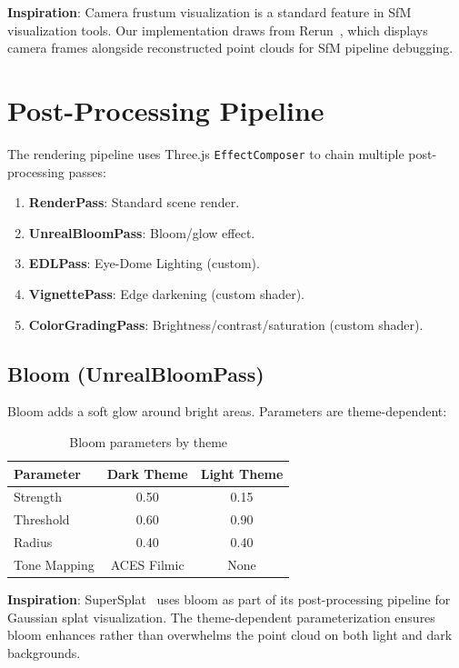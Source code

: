 \documentclass[11pt, letterpaper]{article}
\begin{document}
\textbf{Inspiration}: Camera frustum visualization is a standard feature in SfM visualization tools. Our implementation draws from Rerun~\cite{rerun}, which displays camera frames alongside reconstructed point clouds for SfM pipeline debugging.

\section{Post-Processing Pipeline}

The rendering pipeline uses Three.js \texttt{EffectComposer} to chain multiple post-processing passes:

\begin{enumerate}
    \item \textbf{RenderPass}: Standard scene render.
    \item \textbf{UnrealBloomPass}: Bloom/glow effect.
    \item \textbf{EDLPass}: Eye-Dome Lighting (custom).
    \item \textbf{VignettePass}: Edge darkening (custom shader).
    \item \textbf{ColorGradingPass}: Brightness/contrast/saturation (custom shader).
\end{enumerate}

\subsection{Bloom (UnrealBloomPass)}

Bloom adds a soft glow around bright areas. Parameters are theme-dependent:

\begin{table}[H]
\centering
\caption{Bloom parameters by theme}
\begin{tabular}{@{}lcc@{}}
\toprule
\textbf{Parameter} & \textbf{Dark Theme} & \textbf{Light Theme} \\
\midrule
Strength & 0.50 & 0.15 \\
Threshold & 0.60 & 0.90 \\
Radius & 0.40 & 0.40 \\
Tone Mapping & ACES Filmic & None \\
\bottomrule
\end{tabular}
\end{table}

\textbf{Inspiration}: SuperSplat~\cite{supersplat} uses bloom as part of its post-processing pipeline for Gaussian splat visualization. The theme-dependent parameterization ensures bloom enhances rather than overwhelms the point cloud on both light and dark backgrounds.
\end{document}
